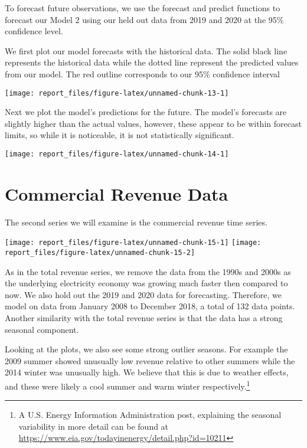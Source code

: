 \documentclass[
]{article}
\begin{document}
To forecast future observations, we use the forecast and predict
functions to forecast our Model 2 using our held out data from 2019 and
2020 at the 95\% confidence level.

We first plot our model forecasts with the historical data. The solid
black line represents the historical data while the dotted line
represent the predicted values from our model. The red outline
corresponds to our 95\% confidence interval

\begin{center}\texttt{[image: report\_files/figure-latex/unnamed-chunk-13-1]} \end{center}

Next we plot the model's predictions for the future. The model's
forecasts are slightly higher than the actual values, however, these
appear to be within forecast limits, so while it is noticeable, it is
not statistically significant.

\begin{center}\texttt{[image: report\_files/figure-latex/unnamed-chunk-14-1]} \end{center}

\section{Commercial Revenue Data}

The second series we will examine is the commercial revenue time series.

\begin{center}\texttt{[image: report\_files/figure-latex/unnamed-chunk-15-1]} \texttt{[image: report\_files/figure-latex/unnamed-chunk-15-2]} \end{center}

As in the total revenue series, we remove the data from the 1990s and
2000s as the underlying electricity economy was growing much faster then
compared to now. We also hold out the 2019 and 2020 data for
forecasting. Therefore, we model on data from January 2008 to December
2018, a total of 132 data points. Another similarity with the total
revenue series is that the data has a strong seasonal component.

Looking at the plots, we also see some strong outlier seasons. For
example the 2009 summer showed unusually low revenue relative to other
summers while the 2014 winter was unusually high. We believe that this
is due to weather effects, and these were likely a cool summer and warm
winter
respectively.\footnote{A U.S. Energy Information Administration post, explaining the seasonal variability in more detail can be found at \url{https://www.eia.gov/todayinenergy/detail.php?id=10211}}
\end{document}
